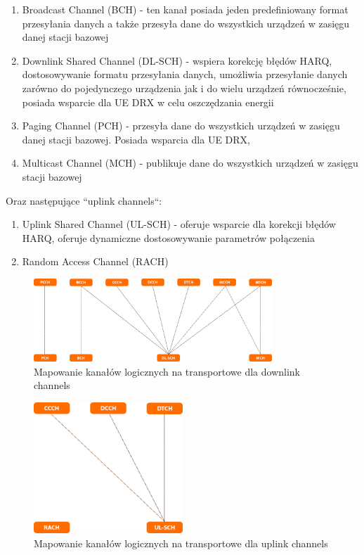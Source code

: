 \begin{enumerate}
	\item Broadcast Channel (BCH) - ten kanał posiada jeden predefiniowany format przesyłania danych a także przesyła dane do wszystkich urządzeń w zasięgu danej stacji bazowej
	\item Downlink Shared Channel (DL-SCH) - wspiera korekcję błędów HARQ, dostosowywanie formatu przesyłania danych, umożliwia przesyłanie danych zarówno do pojedynczego urządzenia jak i do wielu urządzeń równocześnie, posiada wsparcie dla UE DRX w celu oszczędzania energii
	\item Paging Channel (PCH) - przesyła dane do wszystkich urządzeń w zasięgu danej stacji bazowej. Posiada wsparcia dla UE DRX, 
	\item Multicast Channel (MCH) - publikuje dane do wszystkich urządzeń w zasięgu stacji bazowej
\end{enumerate}

Oraz następujące ``uplink channels``:

\begin{enumerate}
	\item Uplink Shared Channel (UL-SCH) - oferuje wsparcie dla korekcji błędów HARQ, oferuje dynamiczne dostosowywanie parametrów połączenia 
	\item Random Access Channel (RACH)
\end{enumerate}

\begin{figure}
	\centerline{\includegraphics[width=0.8\textwidth]{images/mac_downlink_mapping.png}}
	\caption{Mapowanie kanałów logicznych na transportowe dla downlink channels}
	\label{fig:mac_downlink_mapping}
\end{figure}

\begin{figure}
	\centerline{\includegraphics[width=0.5\textwidth]{images/mac_uplink_mapping.png}}
	\caption{Mapowanie kanałów logicznych na transportowe dla uplink channels}
	\label{fig:mac_uplink_mapping}
\end{figure}


